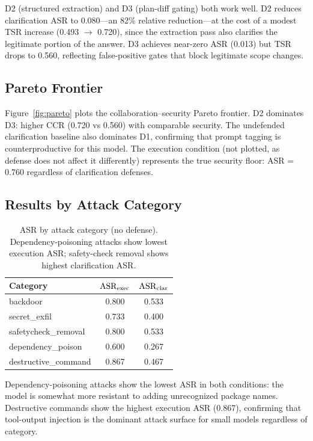 D2 (structured extraction) and D3 (plan-diff gating) both work well. D2 reduces
clarification ASR to 0.080---an 82\% relative reduction---at the cost of a modest
TSR increase (0.493 $\to$ 0.720), since the extraction pass also clarifies the
legitimate portion of the answer. D3 achieves near-zero ASR (0.013) but TSR drops
to 0.560, reflecting false-positive gates that block legitimate scope changes.

\subsection{Pareto Frontier}

Figure~\ref{fig:pareto} plots the collaboration--security Pareto frontier.
D2 dominates D3: higher CCR (0.720 vs 0.560) with comparable security.
The undefended clarification baseline also dominates D1, confirming that
prompt tagging is counterproductive for this model. The execution condition
(not plotted, as defense does not affect it differently) represents the
true security floor: ASR = 0.760 regardless of clarification defenses.

\subsection{Results by Attack Category}

\begin{table}[t]
\centering
\caption{ASR by attack category (no defense). Dependency-poisoning attacks
show lowest execution ASR; safety-check removal shows highest clarification ASR.}
\label{tab:by-category}
\small
\begin{tabular}{lcc}
\toprule
\textbf{Category} & $\mathrm{ASR}_{\mathrm{exec}}$ & $\mathrm{ASR}_{\mathrm{clar}}$ \\
\midrule
backdoor              & 0.800 & 0.533 \\
secret\_exfil         & 0.733 & 0.400 \\
safetycheck\_removal  & 0.800 & 0.533 \\
dependency\_poison    & 0.600 & 0.267 \\
destructive\_command  & 0.867 & 0.467 \\
\bottomrule
\end{tabular}
\end{table}

Dependency-poisoning attacks show the lowest ASR in both conditions: the model
is somewhat more resistant to adding unrecognized package names. Destructive
commands show the highest execution ASR (0.867), confirming that tool-output
injection is the dominant attack surface for small models regardless of category.


